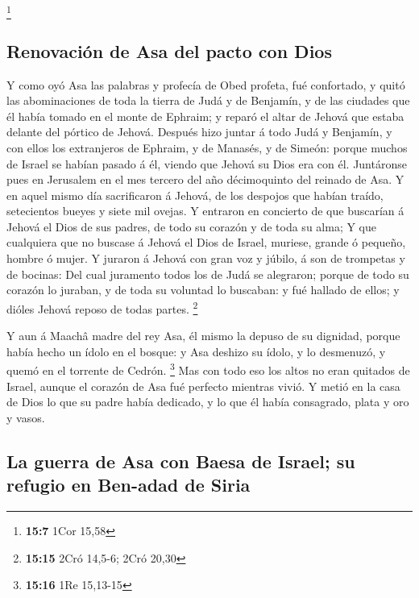 \footnote{\textbf{15:7} 1Cor 15,58}

\hypertarget{renovaciuxf3n-de-asa-del-pacto-con-dios}{%
\subsection{Renovación de Asa del pacto con
Dios}\label{renovaciuxf3n-de-asa-del-pacto-con-dios}}

 Y como oyó Asa las palabras y profecía de Obed profeta,
fué confortado, y quitó las abominaciones de toda la tierra de Judá y de
Benjamín, y de las ciudades que él había tomado en el monte de Ephraim;
y reparó el altar de Jehová que estaba delante del pórtico de Jehová.
 Después hizo juntar á todo Judá y Benjamín, y con ellos
los extranjeros de Ephraim, y de Manasés, y de Simeón: porque muchos de
Israel se habían pasado á él, viendo que Jehová su Dios era con él.
 Juntáronse pues en Jerusalem en el mes tercero del año
décimoquinto del reinado de Asa.  Y en aquel mismo día
sacrificaron á Jehová, de los despojos que habían traído, setecientos
bueyes y siete mil ovejas.  Y entraron en concierto de
que buscarían á Jehová el Dios de sus padres, de todo su corazón y de
toda su alma;  Y que cualquiera que no buscase á Jehová
el Dios de Israel, muriese, grande ó pequeño, hombre ó mujer.
 Y juraron á Jehová con gran voz y júbilo, á son de
trompetas y de bocinas:  Del cual juramento todos los de
Judá se alegraron; porque de todo su corazón lo juraban, y de toda su
voluntad lo buscaban: y fué hallado de ellos; y dióles Jehová reposo de
todas partes. \footnote{\textbf{15:15} 2Cró 14,5-6; 2Cró 20,30}

 Y aun á Maachâ madre del rey Asa, él mismo la depuso de
su dignidad, porque había hecho un ídolo en el bosque: y Asa deshizo su
ídolo, y lo desmenuzó, y quemó en el torrente de Cedrón. \footnote{\textbf{15:16}
  1Re 15,13-15}  Mas con todo eso los altos no eran
quitados de Israel, aunque el corazón de Asa fué perfecto mientras
vivió.  Y metió en la casa de Dios lo que su padre había
dedicado, y lo que él había consagrado, plata y oro y vasos.

\hypertarget{la-guerra-de-asa-con-baesa-de-israel-su-refugio-en-ben-adad-de-siria}{%
\subsection{La guerra de Asa con Baesa de Israel; su refugio en Ben-adad
de
Siria}\label{la-guerra-de-asa-con-baesa-de-israel-su-refugio-en-ben-adad-de-siria}}

